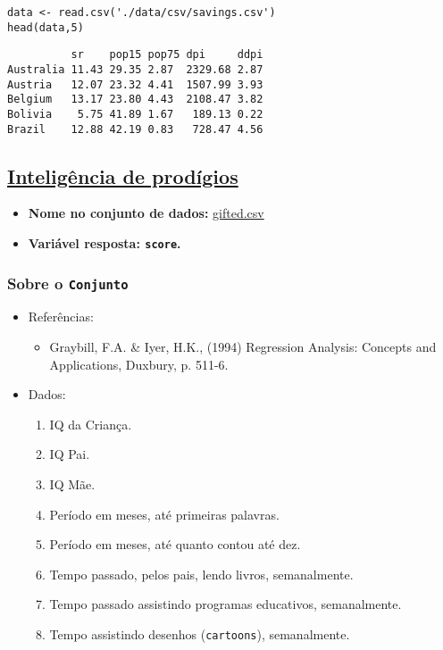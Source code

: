 \documentclass[12pt]{article}
\begin{document}
\begin{verbatim}
data <- read.csv('./data/csv/savings.csv')
head(data,5)
\end{verbatim}

\begin{verbatim}
          sr    pop15 pop75 dpi     ddpi
Australia 11.43 29.35 2.87  2329.68 2.87
Austria   12.07 23.32 4.41  1507.99 3.93
Belgium   13.17 23.80 4.43  2108.47 3.82
Bolivia    5.75 41.89 1.67   189.13 0.22
Brazil    12.88 42.19 0.83   728.47 4.56
\end{verbatim}
\clearpage

\subsection{\href{https://www.openintro.org/data/index.php?data=gifted}{Inteligência de prodígios}}
\label{sec:orgb7fdf77}
\begin{itemize}
\item \textbf{Nome no conjunto de dados:} \href{https://drive.google.com/file/d/1stukrpc\_Rqu-nlYZu\_-BFHNZec676\_BR/view?usp=sharing}{gifted.csv}
\item \textbf{Variável resposta: \texttt{score}.}
\end{itemize}
\subsubsection{Sobre o \texttt{Conjunto}}
\label{sec:orgf6db1f7}
\begin{itemize}
\item Referências:
\begin{itemize}
\item Graybill, F.A. \& Iyer, H.K., (1994) Regression Analysis: Concepts and Applications, Duxbury, p. 511-6.
\end{itemize}
\item Dados:
\begin{enumerate}
\item IQ da Criança.
\item IQ Pai.
\item IQ Mãe.
\item Período em meses, até primeiras palavras.
\item Período em meses, até quanto contou até dez.
\item Tempo passado, pelos pais, lendo livros, semanalmente.
\item Tempo passado assistindo programas educativos, semanalmente.
\item Tempo assistindo desenhos (\texttt{cartoons}), semanalmente.
\end{enumerate}
\end{itemize}
\end{document}
